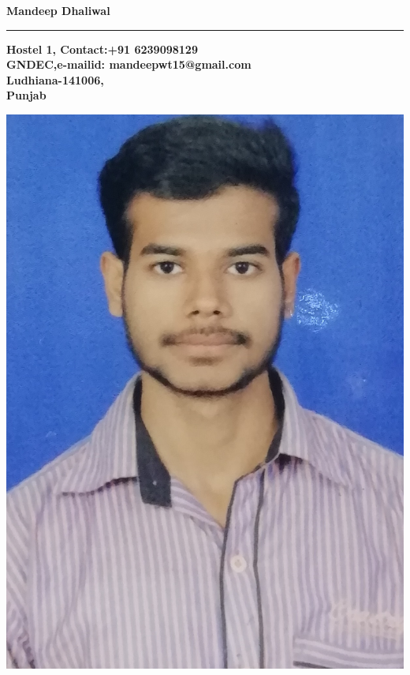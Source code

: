 \documentclass[10pt,doublespace]{article}
\begin{document}
\begin{center}
\large \textbf{Mandeep Dhaliwal\\}
\rule{\textwidth}{1pt}
\end{center}
{\bf \footnotesize
\noindent
Hostel 1, \hfill Contact:+91 6239098129 ~~~~~~~~~~~~~~\\
GNDEC,\hfill e-mailid: mandeepwt15@gmail.com\\
Ludhiana-141006,\\
Punjab
}

\begin{flushright}
\includegraphics[scale=0.05]{me.jpg}
~~~~~~~~~~~~~~~~~~~~~~~~
\end{flushright}
\end{document}
